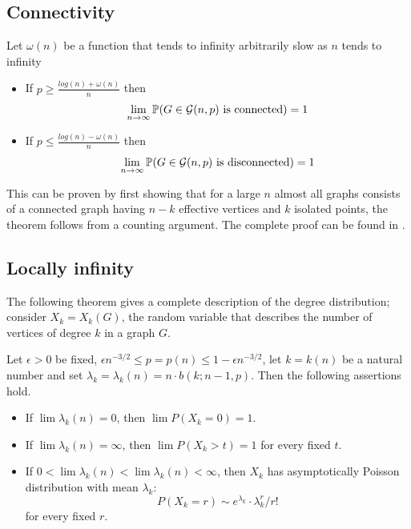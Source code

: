 \subsection{Connectivity}
\begin{theorem}
Let $\omega(n)$ be a function that tends to infinity arbitrarily slow as $n$ tends to infinity
\begin{itemize}
\item If $p\geq \frac{log(n)+ \omega(n)}{n}$ then 
$$\lim_{n \to \infty} \mathbb{P}(G \in \mathcal{G}(n,p) \text{ is connected}) = 1$$
\item If $p\leq \frac{log(n)- \omega(n)}{n}$ then
$$\lim_{n \to \infty} \mathbb{P}(G \in \mathcal{G}(n,p) \text{ is disconnected}) = 1$$
\end{itemize}
\end{theorem}
 
This can be proven by first showing that for a large $n$ almost all graphs consists of a connected graph having $n-k$ effective vertices and $k$ isolated points, the theorem follows from a counting argument. The complete proof can be found in \cite[Erdös-Rényi, p. 59]{Erdos59}.
 
\subsection{Locally infinity}

The following theorem gives a complete description of the degree distribution; consider $X_{k} = X_{k} (G)$, the random variable that describes the number of vertices of degree $k$ in a graph $G$.

\begin{theorem}
Let $\epsilon>0$ be fixed, $\epsilon n^{-3/2} \leq p = p(n) \leq 1 - \epsilon n^{-3/2}$, let $k = k(n)$ be a natural number and set $\lambda_{k} = \lambda_{k}(n) = n\cdot b(k;n - 1,p)$. Then the following assertions hold.

\begin{itemize}
\item If $\lim \lambda_{k}(n) = 0$, then $\lim P(X_{k} = 0) = 1$. 
\item If $\lim \lambda_{k}(n) = \infty$, then $\lim P(X_{k} > t) = 1$
for every fixed $t$.
\item If $0 < \lim\lambda_{k}(n) < \lim \lambda_{k}(n) < \infty$,
then $X_{k}$ has asymptotically Poisson distribution with mean $\lambda_{k}$: 
$$P(X_{k} = r) \sim e^{\lambda_{k}}\cdot \lambda_{k}^{r}/ r!$$
for every fixed $r$.
\end{itemize}
\end{theorem}

